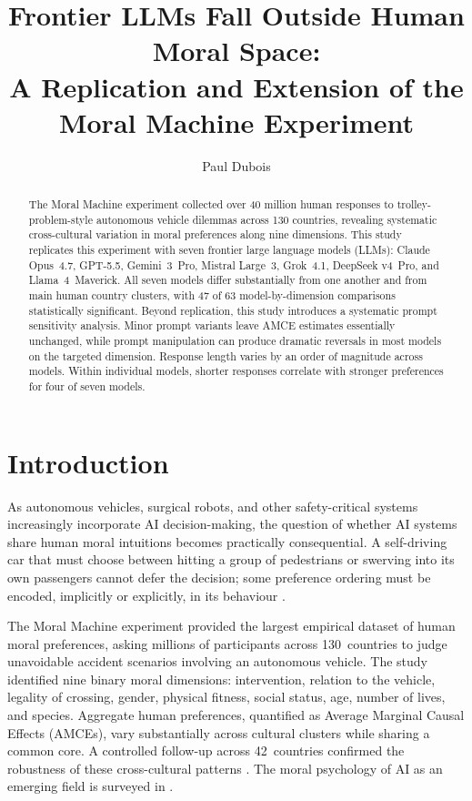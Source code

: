 \documentclass[letterpaper]{article}
\title{Frontier LLMs Fall Outside Human Moral Space:\\
A Replication and Extension of the Moral Machine Experiment}
\author{Paul Dubois}
\begin{document}
\maketitle

\begin{abstract}
The Moral Machine experiment collected over 40 million human responses to
trolley-problem-style autonomous vehicle dilemmas across 130 countries, revealing
systematic cross-cultural variation in moral preferences along nine dimensions.
This study replicates this experiment with seven frontier large language models
(LLMs): Claude Opus~4.7, GPT-5.5, Gemini~3~Pro, Mistral Large~3, Grok~4.1,
DeepSeek v4~Pro, and Llama~4~Maverick. All seven models differ substantially from
one another and from main human country clusters, with 47 of 63 model-by-dimension
comparisons statistically significant. Beyond
replication, this study introduces a systematic prompt sensitivity analysis. Minor
prompt variants leave AMCE estimates essentially unchanged, while prompt
manipulation can produce dramatic reversals in most models on the targeted
dimension. Response length varies by an order of magnitude across models.
Within individual models, shorter responses correlate with stronger preferences 
for four of seven models.
\end{abstract}

\section{Introduction}

As autonomous vehicles, surgical robots, and other safety-critical systems
increasingly incorporate AI decision-making, the question of whether AI systems
share human moral intuitions becomes practically consequential. A self-driving car
that must choose between hitting a group of pedestrians or swerving into its own
passengers cannot defer the decision; some preference ordering must be encoded,
implicitly or explicitly, in its behaviour \citep{bonnefon2016}.

The Moral Machine experiment \citep{awad2018} provided the largest empirical
dataset of human moral preferences, asking millions of participants across
130~countries to judge unavoidable accident scenarios involving an autonomous
vehicle. The study identified nine binary moral dimensions: intervention, relation
to the vehicle, legality of crossing, gender, physical fitness, social status,
age, number of lives, and species. Aggregate human preferences, quantified as
Average Marginal Causal Effects (AMCEs), vary substantially across cultural
clusters while sharing a common core. A controlled follow-up across 42~countries
confirmed the robustness of these cross-cultural patterns \citep{awad2020a}. The
moral psychology of AI as an emerging field is surveyed in \citet{bonnefon2024}.
\end{document}
